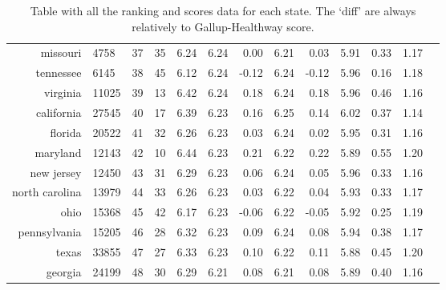 \documentclass{llncs}
\begin{document}
\begin{landscape}
\begin{table}
\begin{tabular}{rlrrrrrrrrrrr}
    missouri & 4758 &  37 &  35 & 6.24 & 6.24 & 0.00 & 6.21 & 0.03 & 5.91 & 0.33 & 1.17 \\
    tennessee & 6145 &  38 &  45 & 6.12 & 6.24 & -0.12 & 6.24 & -0.12 & 5.96 & 0.16 & 1.18 \\
    virginia & 11025 &  39 &  13 & 6.42 & 6.24 & 0.18 & 6.24 & 0.18 & 5.96 & 0.46 & 1.16 \\
    california & 27545 &  40 &  17 & 6.39 & 6.23 & 0.16 & 6.25 & 0.14 & 6.02 & 0.37 & 1.14 \\
    florida & 20522 &  41 &  32 & 6.26 & 6.23 & 0.03 & 6.24 & 0.02 & 5.95 & 0.31 & 1.16 \\
    maryland & 12143 &  42 &  10 & 6.44 & 6.23 & 0.21 & 6.22 & 0.22 & 5.89 & 0.55 & 1.20 \\
    new jersey & 12450 &  43 &  31 & 6.29 & 6.23 & 0.06 & 6.24 & 0.05 & 5.96 & 0.33 & 1.16 \\
    north carolina & 13979 &  44 &  33 & 6.26 & 6.23 & 0.03 & 6.22 & 0.04 & 5.93 & 0.33 & 1.17 \\
    ohio & 15368 &  45 &  42 & 6.17 & 6.23 & -0.06 & 6.22 & -0.05 & 5.92 & 0.25 & 1.19 \\
    pennsylvania & 15205 &  46 &  28 & 6.32 & 6.23 & 0.09 & 6.24 & 0.08 & 5.94 & 0.38 & 1.17 \\
    texas & 33855 &  47 &  27 & 6.33 & 6.23 & 0.10 & 6.22 & 0.11 & 5.88 & 0.45 & 1.20 \\
    georgia & 24199 &  48 &  30 & 6.29 & 6.21 & 0.08 & 6.21 & 0.08 & 5.89 & 0.40 & 1.16 \\
   \hline
\end{tabular}
\caption{Table with all the ranking and scores data for each state. The `diff' are always relatively to Gallup-Healthway score.}
\end{table}

\end{landscape}
\restoregeometry
\end{document}
